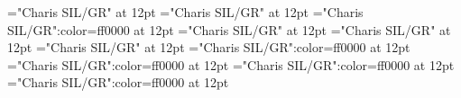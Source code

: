 \documentclass[a4paper]{article}
\begin{document}
\pagestyle{plain}
\sloppy
\setlength{\parfillskip}{0pt plus 1fil}
\font\sectionletter="Charis SIL/GR" at 12pt
\font\articlesectionletter="Charis SIL/GR" at 12pt
\font\firstoftypesensearticlesectionletter="Charis SIL/GR":color=ff0000 at 12pt
\font\firstoftypeheadwordlastoftypesectionletter="Charis SIL/GR" at 12pt
\font\firstoftypelastoftypepronunciationarticlesectionletter="Charis SIL/GR" at 12pt
\font\firstoftypelastoftypestressfirstoftypelastoftypepronunciationarticlesectionletter="Charis SIL/GR" at 12pt
\font\lastoftypesensearticlesectionletter="Charis SIL/GR":color=ff0000 at 12pt
\font\firstoftypegrammarcategorylastoftypelastoftypesensearticlesectionletter="Charis SIL/GR":color=ff0000 at 12pt
\font\exampleusefirstoftypelastoftypelastoftypesensearticlesectionletter="Charis SIL/GR":color=ff0000 at 12pt
\font\examplefirstoftypelastoftypelastoftypesensearticlesectionletter="Charis SIL/GR":color=ff0000 at 12pt

\mbox{} 
\newpage 
\newpage 
\setcounter{page}{1} 
\pagestyle{fancy} 

\end{document}
